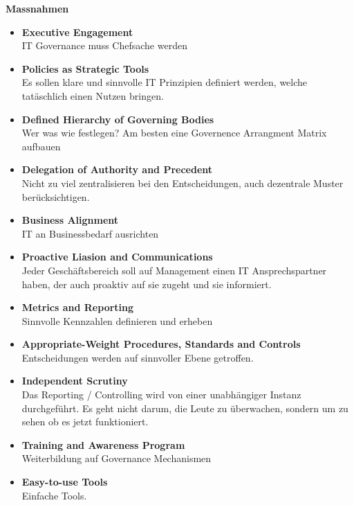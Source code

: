 \textbf{Massnahmen}
\begin{itemize}
	\item \textbf{Executive Engagement} \\
	IT Governance muss Chefsache werden
	\item \textbf{Policies as Strategic Tools} \\
		Es sollen klare und sinnvolle IT Prinzipien definiert werden, welche tatäschlich einen Nutzen bringen.
	\item \textbf{Defined Hierarchy of Governing Bodies} \\
		Wer was wie festlegen? Am besten eine Governence Arrangment Matrix aufbauen
	\item \textbf{Delegation of Authority and Precedent} \\
		Nicht zu viel zentralisieren bei den Entscheidungen, auch dezentrale Muster berücksichtigen.
	\item \textbf{Business Alignment} \\
		IT an Businessbedarf ausrichten
	\item \textbf{Proactive Liasion and Communications} \\
		Jeder Geschäftsbereich soll auf Management einen IT Ansprechspartner haben, der auch proaktiv auf sie zugeht und sie informiert.
	\item \textbf{Metrics and Reporting} \\
		Sinnvolle Kennzahlen definieren und erheben
	\item \textbf{Appropriate-Weight Procedures, Standards and Controls} \\
		Entscheidungen werden auf sinnvoller Ebene getroffen.
	\item \textbf{Independent Scrutiny} \\
		Das Reporting / Controlling wird von einer unabhängiger Instanz durchgeführt. Es geht nicht darum, die Leute zu überwachen, sondern um zu sehen ob es jetzt funktioniert.
	\item \textbf{Training and Awareness Program} \\
		Weiterbildung auf Governance Mechanismen
	\item \textbf{Easy-to-use Tools} \\
		Einfache Tools.
\end{itemize}